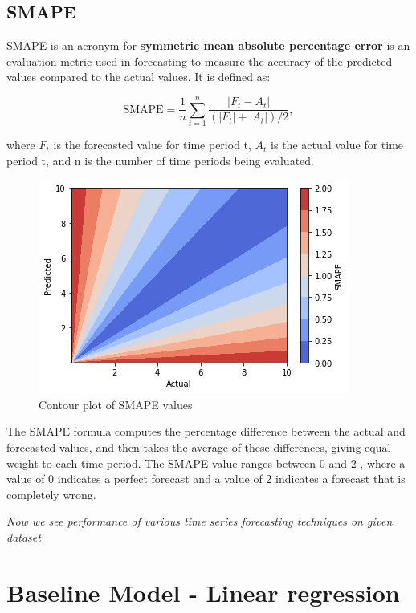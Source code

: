\documentclass{article}
\begin{document}
\subsection{SMAPE}
SMAPE is an acronym for \textbf{symmetric mean absolute percentage error} is an evaluation metric used in forecasting to measure the accuracy of the predicted values compared to the actual values. It is defined as:

\vspace{1em}
\begin{equation*}
	\text{SMAPE} = \frac{1}{n} \sum_{t=1}^n \frac{|F_t - A_t|}{(|F_t| + |A_t|)/2},
\end{equation*}

\vspace{1em}
where $F_t$ is the forecasted value for time period t, $A_t$ is the actual value for time period t, and n is the number of time periods being evaluated. 

\begin{figure}[h]
	\centering
	\includegraphics[scale=0.5]{images/smape_contour}
	\caption{Contour plot of SMAPE values}
\end{figure}

\vspace{1em}
The SMAPE formula computes the percentage difference between the actual and forecasted values, and then takes the average of these differences, giving equal weight to each time period. The SMAPE value ranges between 0 and 2 , where a value of 0 indicates a perfect forecast and a value of 2 indicates a forecast that is completely wrong.

\vspace{2em}
\textit{Now we see performance of various time series forecasting techniques on given dataset}

\section{\centering Baseline Model - Linear regression}
\end{document}
